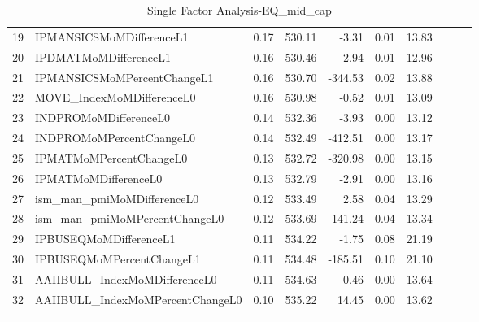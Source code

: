 \begin{longtable}{rlrrrrrlll}
  19 & IPMANSICSMoMDifferenceL1 & 0.17 & 530.11 & -3.31 & 0.01 & 13.83 &  &  &  \\ 
  20 & IPDMATMoMDifferenceL1 & 0.16 & 530.46 & 2.94 & 0.01 & 12.96 &  &  &  \\ 
  21 & IPMANSICSMoMPercentChangeL1 & 0.16 & 530.70 & -344.53 & 0.02 & 13.88 &  &  &  \\ 
  22 & MOVE\_IndexMoMDifferenceL0 & 0.16 & 530.98 & -0.52 & 0.01 & 13.09 &  &  &  \\ 
  23 & INDPROMoMDifferenceL0 & 0.14 & 532.36 & -3.93 & 0.00 & 13.12 &  &  &  \\ 
  24 & INDPROMoMPercentChangeL0 & 0.14 & 532.49 & -412.51 & 0.00 & 13.17 &  &  &  \\ 
  25 & IPMATMoMPercentChangeL0 & 0.13 & 532.72 & -320.98 & 0.00 & 13.15 &  &  &  \\ 
  26 & IPMATMoMDifferenceL0 & 0.13 & 532.79 & -2.91 & 0.00 & 13.16 &  &  &  \\ 
  27 & ism\_man\_pmiMoMDifferenceL0 & 0.12 & 533.49 & 2.58 & 0.04 & 13.29 &  &  &  \\ 
  28 & ism\_man\_pmiMoMPercentChangeL0 & 0.12 & 533.69 & 141.24 & 0.04 & 13.34 &  &  &  \\ 
  29 & IPBUSEQMoMDifferenceL1 & 0.11 & 534.22 & -1.75 & 0.08 & 21.19 &  &  &  \\ 
  30 & IPBUSEQMoMPercentChangeL1 & 0.11 & 534.48 & -185.51 & 0.10 & 21.10 &  &  &  \\ 
  31 & AAIIBULL\_IndexMoMDifferenceL0 & 0.11 & 534.63 & 0.46 & 0.00 & 13.64 &  &  &  \\ 
  32 & AAIIBULL\_IndexMoMPercentChangeL0 & 0.10 & 535.22 & 14.45 & 0.00 & 13.62 &  &  &  \\ 
   \hline
\hline
\caption{Single Factor Analysis-EQ_mid_cap} 
\end{longtable}
